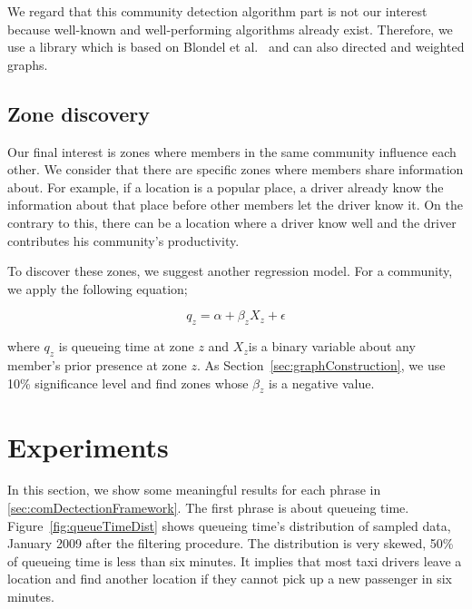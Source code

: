 \documentclass{article}
\begin{document}
We regard that this community detection algorithm part is not our interest because well-known and well-performing algorithms already exist. Therefore, we use a library which is based on  Blondel et al.~ and can also directed and weighted graphs.


\subsection{Zone discovery} \label{sec:zoneDiscovery}

Our final interest is zones where members in the same community influence each other. We consider that there are specific zones where members share information about. For example, if a location is a popular place, a driver already know the information about that place before other members let the driver know it. On the contrary to this, there can be a location where a driver know well and the driver contributes his community's productivity.

To discover these zones, we suggest another regression model. For a community, we apply the following equation;

\begin{equation} \label{eq:zoneRegression}
    q_{z}= \alpha + \beta_{z}X_{z} + \epsilon
\end{equation}

\noindent where $q_{z}$ is queueing time at zone $z$ and $X_{z}$is a binary variable about any member's prior presence at zone $z$. As Section~\ref{sec:graphConstruction}, we use 10\% significance level and find zones whose $\beta_{z}$ is a negative value.
\section{Experiments} \label{sec:experiments}

In this section, we show some meaningful results for each phrase in \ref{sec:comDectectionFramework}. The first phrase is about queueing time. Figure~\ref{fig:queueTimeDist} shows queueing time's distribution of sampled data, January 2009 after the filtering procedure. The distribution is very skewed, 50\% of queueing time is less than six minutes. It implies that most taxi drivers leave a location and find another location if they cannot pick up a new passenger in six minutes. 
\end{document}
